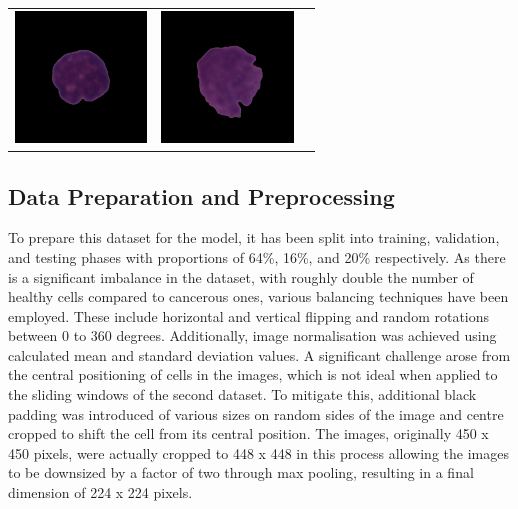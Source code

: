 \documentclass[
	a4paper,
	10pt,
	unnumberedsections,
	twoside,
]{research_article}
\begin{document}
\begin{tabular}{m{3.25cm} m{4cm} m{4cm}}
	\includegraphics[width=3.5cm]{images/UID_H10_100_1_hem.png} & \includegraphics[width=3.5cm]{images/UID_11_10_1_all.png} \\
\end{tabular}

\subsection{Data Preparation and Preprocessing}

To prepare this dataset for the model, it has been split into training, validation, and testing phases with proportions of 64\%, 16\%, and 20\% respectively. As there is a significant imbalance in the dataset, with roughly double the number of healthy cells compared to cancerous ones, various balancing techniques have been employed. These include horizontal and vertical flipping and random rotations between 0 to 360 degrees. Additionally, image normalisation was achieved using calculated mean and standard deviation values. A significant challenge arose from the central positioning of cells in the images, which is not ideal when applied to the sliding windows of the second dataset. To mitigate this, additional black padding was introduced of various sizes on random sides of the image and centre cropped to shift the cell from its central position. The images, originally 450 x 450 pixels, were actually cropped to 448 x 448 in this process allowing the images to be downsized by a factor of two through max pooling, resulting in a final dimension of 224 x 224 pixels.
\end{document}
